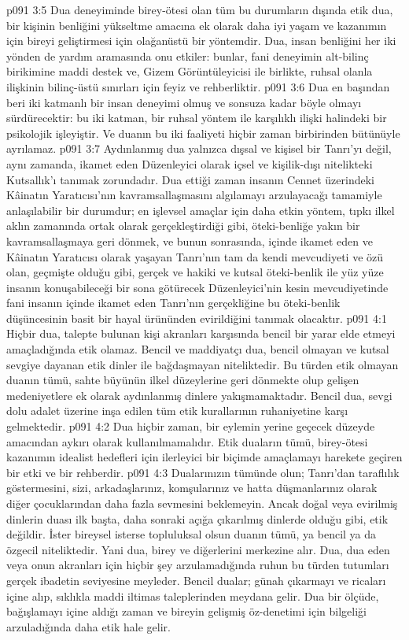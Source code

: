 \vs p091 3:5 Dua deneyiminde birey\hyp{}ötesi olan tüm bu durumların dışında etik dua, bir kişinin benliğini yükseltme amacına ek olarak daha iyi yaşam ve kazanımın için bireyi geliştirmesi için olağanüstü bir yöntemdir. Dua, insan benliğini her iki yönden de yardım aramasında onu etkiler: bunlar, fani deneyimin alt\hyp{}bilinç birikimine maddi destek ve, Gizem Görüntüleyicisi ile birlikte, ruhsal olanla ilişkinin bilinç\hyp{}üstü sınırları için feyiz ve rehberliktir.
\vs p091 3:6 Dua en başından beri iki katmanlı bir insan deneyimi olmuş ve sonsuza kadar böyle olmayı sürdürecektir: bu iki katman, bir ruhsal yöntem ile karşılıklı ilişki halindeki bir psikolojik işleyiştir. Ve duanın bu iki faaliyeti hiçbir zaman birbirinden bütünüyle ayrılamaz.
\vs p091 3:7 Aydınlanmış dua yalnızca dışsal ve kişisel bir Tanrı’yı değil, aynı zamanda, ikamet eden Düzenleyici olarak içsel ve kişilik\hyp{}dışı nitelikteki Kutsallık’ı tanımak zorundadır. Dua ettiği zaman insanın Cennet üzerindeki Kâinatın Yaratıcısı’nın kavramsallaşmasını algılamayı arzulayacağı tamamiyle anlaşılabilir bir durumdur; en işlevsel amaçlar için daha etkin yöntem, tıpkı ilkel aklın zamanında ortak olarak gerçekleştirdiği gibi, öteki\hyp{}benliğe yakın bir kavramsallaşmaya geri dönmek, ve bunun sonrasında, içinde ikamet eden ve Kâinatın Yaratıcısı olarak yaşayan Tanrı’nın tam da kendi mevcudiyeti ve özü olan, geçmişte olduğu gibi, gerçek ve hakiki ve kutsal öteki\hyp{}benlik ile yüz yüze insanın konuşabileceği bir sona götürecek Düzenleyici’nin kesin mevcudiyetinde fani insanın içinde ikamet eden Tanrı’nın gerçekliğine bu öteki\hyp{}benlik düşüncesinin basit bir hayal ürününden evirildiğini tanımak olacaktır.
\vs p091 4:1 Hiçbir dua, talepte bulunan kişi akranları karşısında bencil bir yarar elde etmeyi amaçladığında etik olamaz. Bencil ve maddiyatçı dua, bencil olmayan ve kutsal sevgiye dayanan etik dinler ile bağdaşmayan niteliktedir. Bu türden etik olmayan duanın tümü, sahte büyünün ilkel düzeylerine geri dönmekte olup gelişen medeniyetlere ek olarak aydınlanmış dinlere yakışmamaktadır. Bencil dua, sevgi dolu adalet üzerine inşa edilen tüm etik kurallarının ruhaniyetine karşı gelmektedir.
\vs p091 4:2 Dua hiçbir zaman, bir eylemin yerine geçecek düzeyde amacından aykırı olarak kullanılmamalıdır. Etik duaların tümü, birey\hyp{}ötesi kazanımın idealist hedefleri için ilerleyici bir biçimde amaçlamayı harekete geçiren bir etki ve bir rehberdir.
\vs p091 4:3 Dualarınızın tümünde  olun; Tanrı’dan taraflılık göstermesini, sizi, arkadaşlarınız, komşularınız ve hatta düşmanlarınız olarak diğer çocuklarından daha fazla sevmesini beklemeyin. Ancak doğal veya evirilmiş dinlerin duası ilk başta, daha sonraki açığa çıkarılmış dinlerde olduğu gibi, etik değildir. İster bireysel isterse topluluksal olsun duanın tümü, ya bencil ya da özgecil niteliktedir. Yani dua, birey ve diğerlerini merkezine alır. Dua, dua eden veya onun akranları için hiçbir şey arzulamadığında ruhun bu türden tutumları gerçek ibadetin seviyesine meyleder. Bencil dualar; günah çıkarmayı ve ricaları içine alıp, sıklıkla maddi iltimas taleplerinden meydana gelir. Dua bir ölçüde, bağışlamayı içine aldığı zaman ve bireyin gelişmiş öz\hyp{}denetimi için bilgeliği arzuladığında daha etik hale gelir.
